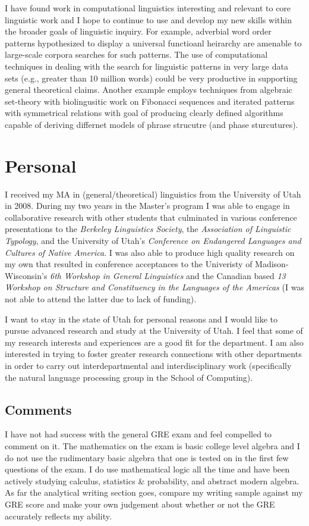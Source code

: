 \documentclass{article}
\begin{document}
I have found work in computational linguistics interesting and relevant to core linguistic work and I hope to continue to use and develop my new skills within the broader goals of linguistic inquiry. For example, adverbial word order patterns hypothesized to display a universal functioanl heirarchy are amenable to large-scale corpora searches for such patterns. The use of computational techniques in dealing with the search for linguistic patterns in very large data sets (e.g., greater than 10 million words) could be very productive in supporting general theoretical claims. Another example employs techniques from algebraic set-theory with biolingusitic work on Fibonacci sequences and iterated patterns with symmetrical relations with goal of producing clearly defined algorithms capable of deriving differnet models of phrase strucutre (and phase sturcutures).
 

\section{Personal}
I received my MA in (general/theoretical) linguistics from the University of Utah in 2008. During my two years in the Master's program I was able to engage in collaborative research with other students that culminated in various conference presentations to the {\sl Berkeley Linguistics Society}, the {\sl Association of Linguistic Typology}, and the University of Utah's {\sl Conference on Endangered Languages and Cultures of Native America}. I was also able to produce high quality research on my own that resulted in conference acceptances to the Univeristy of Madison-Wisconsin's {\sl 6th Workshop in General Linguistics} and the Canadian based {\sl 13 Workshop on Structure and Constituency in the Languages of the Americas} (I was not able to attend the latter due to lack of funding).

I want to stay in the state of Utah for personal reasons and I would like to pursue advanced research and study at the University of Utah. I feel that some of my research interests and experiences are a good fit for the department. I am also interested in trying to foster greater research connections with other departments in order to carry out interdepartmental and interdisciplinary work (specifically the natural language processing group in the School of Computing).

\subsection{Comments}
I have not had success with the general GRE exam and feel compelled to comment on it. The mathematics on the exam is basic college level algebra and I do not use the rudimentary basic algebra that one is tested on in the first few questions of the exam. I do use mathematical logic all the time and have been actively studying calculus, statistics \& probability, and abstract modern algebra.  As far the analytical writing section goes, compare my writing sample against my GRE score and make your own judgement about whether or not the GRE accurately reflects my ability. 
\end{document}
